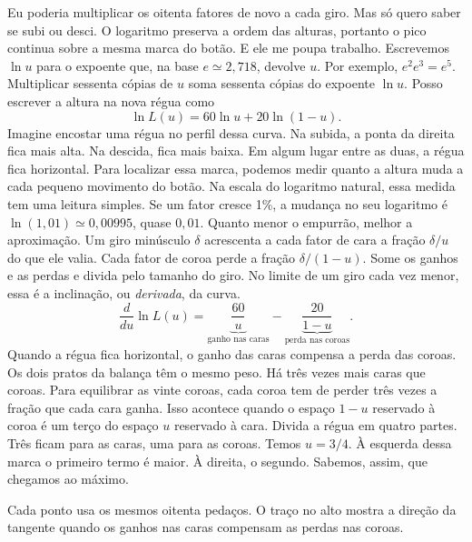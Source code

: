 \documentclass[12pt,oneside]{article}
\begin{document}
Eu poderia multiplicar os oitenta fatores de novo a cada giro. Mas só quero saber se subi ou desci. O logaritmo preserva a ordem das alturas, portanto o pico continua sobre a mesma marca do botão. E ele me poupa trabalho. Escrevemos $\ln u$ para o expoente que, na base $e\simeq2{,}718$, devolve $u$. Por exemplo, $e^2e^3=e^5$. Multiplicar sessenta cópias de $u$ soma sessenta cópias do expoente $\ln u$. Posso escrever a altura na nova régua como
\[
              \ln L(u)=60\ln u+20\ln(1-u).
\]
Imagine encostar uma régua no perfil dessa curva. Na subida, a ponta da direita fica mais alta. Na descida, fica mais baixa. Em algum lugar entre as duas, a régua fica horizontal. Para localizar essa marca, podemos medir quanto a altura muda a cada pequeno movimento do botão. Na escala do logaritmo natural, essa medida tem uma leitura simples. Se um fator cresce 1\%, a mudança no seu logaritmo é $\ln(1{,}01)\simeq0{,}00995$, quase $0{,}01$. Quanto menor o empurrão, melhor a aproximação. Um giro minúsculo $\delta$ acrescenta a cada fator de cara a fração $\delta/u$ do que ele valia. Cada fator de coroa perde a fração $\delta/(1-u)$. Some os ganhos e as perdas e divida pelo tamanho do giro. No limite de um giro cada vez menor, essa é a inclinação, ou \emph{derivada}, da curva.
\[
 \frac{d}{du}\ln L(u)
   =\underbrace{\frac{60}{u}}_{\text{ganho nas caras}}
    -\underbrace{\frac{20}{1-u}}_{\text{perda nas coroas}}.
\]
Quando a régua fica horizontal, o ganho das caras compensa a perda das coroas. Os dois pratos da balança têm o mesmo peso. Há três vezes mais caras que coroas. Para equilibrar as vinte coroas, cada coroa tem de perder três vezes a fração que cada cara ganha. Isso acontece quando o espaço $1-u$ reservado à coroa é um terço do espaço $u$ reservado à cara. Divida a régua em quatro partes. Três ficam para as caras, uma para as coroas. Temos $u=3/4$. À esquerda dessa marca o primeiro termo é maior. À direita, o segundo. Sabemos, assim, que chegamos ao máximo.

\par\addvspace{5pt}\noindent\begin{minipage}{\linewidth}\centering
{}\par
{\footnotesize\raggedright Cada ponto usa os mesmos oitenta pedaços. O traço no alto mostra a direção da tangente quando os ganhos nas caras compensam as perdas nas coroas.\par}
\end{minipage}\par\addvspace{5pt}
\end{document}
